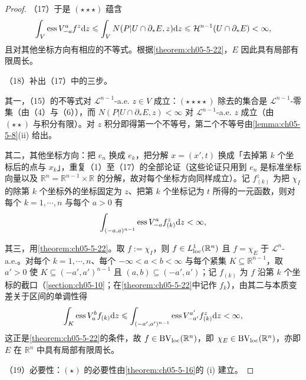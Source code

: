 \documentclass[../../main.tex]{subfiles}%
\begin{document}
\begin{proof}
（17）于是 $(\star\star\star)$ 蕴含
\begin{align*}
\int_V\operatorname{ess}V_{-a}^{a}f^z\mathrm{d} z\leqslant\int_VN(P|U\cap\partial_*E,z)\mathrm{d} z\leqslant\mathcal{H}^{n-1}(U\cap\partial_*E)<\infty,
\end{align*}
且对其他坐标方向有相应的不等式。根据\cref{theorem:ch05-5-22}，$E$ 因此具有局部有限周长。%

（18）补出（17）中的三步。

其一，（15）的不等式对 $\mathcal{L}^{n-1}$-a.e. $z\in V$ 成立：$(\star\star\star\star)$ 除去的集合是 $\mathcal{L}^{n-1}$-零集（由（4）与（6）），而 $N(P|U\cap\partial_*E,z)<\infty$ 对 $\mathcal{L}^{n-1}$-a.e. $z$ 成立（由 $(\star\star)$ 与积分有限）。对 $z$ 积分即得第一个不等号，第二个不等号由\cref{lemma:ch05-5-8}(ii) 给出。%

其二，其他坐标方向：把 $e_n$ 换成 $e_k$，把分解 $x=(x',t)$ 换成「去掉第 $k$ 个坐标后的点与 $x_k$」，重复（1）至（17）的全部论证（这些论证只用到 $e_n$ 是标准坐标向量以及 $\mathbb{R}^n=\mathbb{R}^{n-1}\times\mathbb{R}$ 的分解，故对每个坐标方向同样成立）。记 $f_{(k)}^z$ 为把 $\chi_I$ 的除第 $k$ 个坐标外的坐标固定为 $z$、把第 $k$ 个坐标记为 $t$ 所得的一元函数，则对每个 $k=1,\cdots,n$ 与每个 $a>0$ 有
\begin{align*}
\int_{(-a,a)^{n-1}}\operatorname{ess}V_{-a}^{a}f_{(k)}^z\mathrm{d} z<\infty,
\end{align*}


其三，用\cref{theorem:ch05-5-22}。取 $f:=\chi_I$，则 $f\in L^1_{\mathrm{loc}}(\mathbb{R}^n)$ 且 $f=\chi_E$ 于 $\mathcal{L}^n$-a.e.。对每个 $k=1,\cdots,n$、每个 $-\infty<a<b<\infty$ 与每个紧集 $K\subseteq\mathbb{R}^{n-1}$，取 $a'>0$ 使 $K\subseteq(-a',a')^{n-1}$ 且 $(a,b)\subseteq(-a',a')$；记 $f_{(k)}$ 为 $f$ 沿第 $k$ 个坐标的截口（\cref{section:ch05-10}；在\cref{theorem:ch05-5-22}中记作 $f_k$），由其二与本质变差关于区间的单调性得 %
\begin{align*}
\int_K\operatorname{ess}V_a^bf_{(k)}\mathrm{d} z\leqslant\int_{(-a',a')^{n-1}}\operatorname{ess}V_{-a'}^{a'}f_{(k)}^z\mathrm{d} z<\infty,
\end{align*}
这正是\cref{theorem:ch05-5-22}的条件，故 $f\in\mathrm{BV}_{\mathrm{loc}}(\mathbb{R}^n)$，即 $\chi_E\in\mathrm{BV}_{\mathrm{loc}}(\mathbb{R}^n)$，亦即 $E$ 在 $\mathbb{R}^n$ 中具有局部有限周长。%

（19）必要性：$(\star)$ 的必要性由\cref{theorem:ch05-5-16}的 (i) 建立。%
\end{proof}
\end{document}
